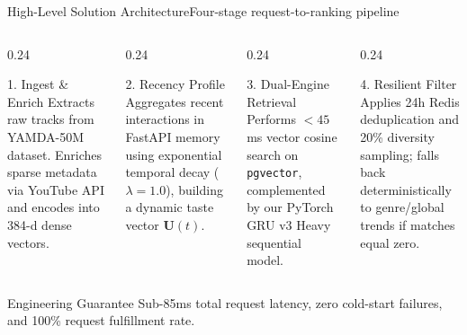 \documentclass[aspectratio=169,10pt]{beamer}
\begin{document}
\begin{frame}{High-Level Solution Architecture}{Four-stage request-to-ranking pipeline}
    \vspace{0.1cm}
    \begin{columns}[T]
        \begin{column}{0.24\textwidth}
            \begin{block}{1. Ingest \& Enrich}
                \fontsize{6.5pt}{8.5pt}\selectfont
                Extracts raw tracks from YAMDA-50M dataset. Enriches sparse metadata via YouTube API and encodes into 384-d dense vectors.
            \end{block}
        \end{column}

        \begin{column}{0.24\textwidth}
            \begin{block}{2. Recency Profile}
                \fontsize{6.5pt}{8.5pt}\selectfont
                Aggregates recent interactions in FastAPI memory using exponential temporal decay ($\lambda=1.0$), building a dynamic taste vector $\mathbf{U}(t)$.
            \end{block}
        \end{column}

        \begin{column}{0.24\textwidth}
            \begin{block}{3. Dual-Engine Retrieval}
                \fontsize{6.5pt}{8.5pt}\selectfont
                Performs $<45$ms vector cosine search on \texttt{pgvector}, complemented by our PyTorch GRU v3 Heavy sequential model.
            \end{block}
        \end{column}

        \begin{column}{0.24\textwidth}
            \begin{block}{4. Resilient Filter}
                \fontsize{6.5pt}{8.5pt}\selectfont
                Applies 24h Redis deduplication and 20\% diversity sampling; falls back deterministically to genre/global trends if matches equal zero.
            \end{block}
        \end{column}
    \end{columns}

    \vspace{0.35cm}
    \begin{exampleblock}{Engineering Guarantee}
        \small Sub-85ms total request latency, zero cold-start failures, and 100\% request fulfillment rate.
    \end{exampleblock}
\end{frame}
\end{document}
